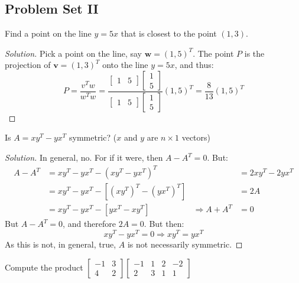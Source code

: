 \documentclass[../main.tex]{subfiles}
\begin{document}
\subsection{Problem Set II}
%
\begin{problem}
Find a point on the line $y=5x$ that is closest to the point $(1,3)$.
\end{problem}
\begin{proof}[Solution]
Pick a point on the line, say $\mathbf{w} = (1,5)^T$. The point $P$ is the projection of $\mathbf{v} = (1,3)^T$ onto the line $y=5x$, and thus:
\begin{equation*}
    P = \frac{v^T w}{w^T w} = \frac{\begin{bmatrix}1 & 5 \end{bmatrix}\begin{bmatrix}1 \\ 5\end{bmatrix}}{\begin{bmatrix}1 & 5 \end{bmatrix}\begin{bmatrix}1 \\ 5\end{bmatrix}}(1,5)^T = \frac{8}{13}(1,5)^T
\end{equation*}
\end{proof}
%
\begin{problem}
Is $A = xy^T - yx^T$ symmetric? ($x$ and $y$ are $n\times 1$ vectors)
\end{problem}
\begin{proof}[Solution]
In general, no. For if it were, then $A-A^T = 0$. But:
\begin{align*}
    A-A^T &= xy^T - yx^T - (xy^T-yx^T)^T & &= 2xy^T-2yx^T\\
    &= xy^T - yx^T -[(xy^T)^T-(yx^T)^T] & &= 2A\\
    &= xy^T - yx^T - [yx^T - xy^T] & \Rightarrow A+A^{T}&=0 
\end{align*}
But $A-A^{T} = 0$, and therefore $2A = 0$. But then:
\begin{equation*}
    xy^T - yx^T = 0 \Rightarrow xy^T = yx^T    
\end{equation*}
As this is not, in general, true, $A$ is not necessarily symmetric.
\end{proof}
%
\begin{problem}
Compute the product $\begin{bmatrix} -1 & 3 \\ 4 & 2 \end{bmatrix} \begin{bmatrix} -1 & 1 & 2 & -2 \\ 2 & 3 & 1 & 1 \end{bmatrix}$
\end{problem}
\end{document}

